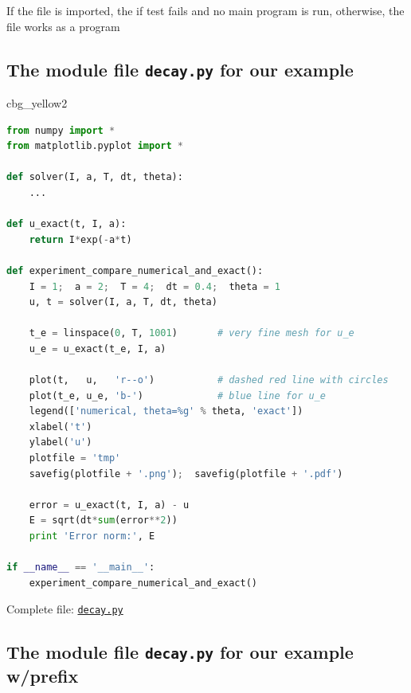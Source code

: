 \documentclass[%
oneside,                 %
final,                   %
10pt]{article}
\newenvironment{_cod_tight}[1]{
   \def\FrameCommand{\colorbox{#1}}
   \FrameRule0.6pt\MakeFramed {\FrameRestore}\vskip3mm}
   {\vskip0mm\endMakeFramed}
\newenvironment{cod}[1]{
\bgroup\rmfamily
\fboxsep=0mm\relax
\begin{_cod_tight}{#1}
\list{}{\parsep=-2mm\parskip=0mm\topsep=0pt\leftmargin=2mm
\rightmargin=2\leftmargin\leftmargin=4pt\relax}
\item\relax}
{\endlist\end{_cod_tight}\egroup}
\begin{document}
If the file is imported, the if test fails and no main program is run,
otherwise, the file works as a program

\subsection*{The module file \texttt{decay.py} for our example}

\begin{cod}{cbg_yellow2}\begin{lstlisting}[language=Python,style=simple,xleftmargin=2mm]
from numpy import *
from matplotlib.pyplot import *

def solver(I, a, T, dt, theta):
    ...

def u_exact(t, I, a):
    return I*exp(-a*t)

def experiment_compare_numerical_and_exact():
    I = 1;  a = 2;  T = 4;  dt = 0.4;  theta = 1
    u, t = solver(I, a, T, dt, theta)

    t_e = linspace(0, T, 1001)       # very fine mesh for u_e
    u_e = u_exact(t_e, I, a)

    plot(t,   u,   'r--o')           # dashed red line with circles
    plot(t_e, u_e, 'b-')             # blue line for u_e
    legend(['numerical, theta=%g' % theta, 'exact'])
    xlabel('t')
    ylabel('u')
    plotfile = 'tmp'
    savefig(plotfile + '.png');  savefig(plotfile + '.pdf')

    error = u_exact(t, I, a) - u
    E = sqrt(dt*sum(error**2))
    print 'Error norm:', E

if __name__ == '__main__':
    experiment_compare_numerical_and_exact()
\end{lstlisting}\end{cod}
\noindent

Complete file: \href{{http://tinyurl.com/ofkw6kc/softeng/decay.py}}{\nolinkurl{decay.py}}

\subsection*{The module file \texttt{decay.py} for our example w/prefix}
\end{document}

